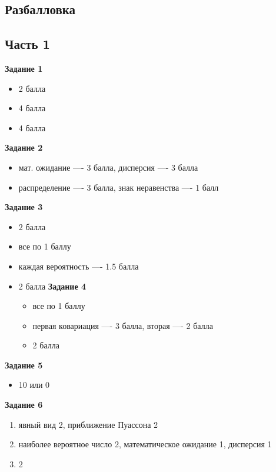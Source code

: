 \documentclass[a4paper,12pt]{article}
\theoremstyle{plain}                         %
\theoremstyle{definition}                  %
\theoremstyle{remark}                      %
\begin{document}
\begin{center}
\section*{Разбалловка}
\subsection*{Часть 1}
\end{center}

\textbf{Задание 1}
\begin{itemize}
\item 2 балла
\item 4 балла
\item 4 балла
\end{itemize}

\textbf{Задание 2}
\begin{itemize}
\item мат. ожидание —- 3 балла, дисперсия —- 3 балла
\item распределение —- 3 балла, знак неравенства —- 1 балл

\end{itemize}

\textbf{Задание 3}
\begin{itemize}
\item 2 балла
\item все по 1 баллу
\item каждая вероятность —- 1.5 балла
\item 2 балла
\textbf{Задание 4}
\begin{itemize}
\item все по 1 баллу
\item первая ковариация —- 3 балла, вторая —- 2 балла
\item 2 балла
\end{itemize}

\end{itemize}

\textbf{Задание 5}
\begin{itemize}
\item 10 или 0
\end{itemize}

\textbf{Задание 6}
\begin{enumerate}
\item явный вид 2, приближение Пуассона 2
\item наиболее вероятное число 2, математическое ожидание 1, дисперсия 1
\item 2
\end{enumerate}
\end{document}
